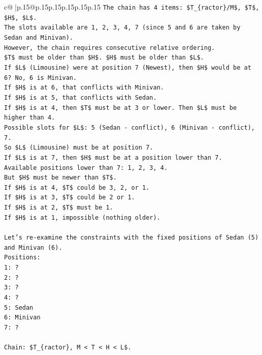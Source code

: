 \documentclass{article}
\begin{document}
{\begin{supertabular}{c@{$\;$}|p{.15\linewidth}@{}p{.15\linewidth}p{.15\linewidth}p{.15\linewidth}p{.15\linewidth}p{.15\linewidth}}
{{{\texttt{The chain has 4 items: \$T\_\{ractor\}/M\$, \$T\$, \$H\$, \$L\$.} \\
\texttt{The slots available are 1, 2, 3, 4, 7 (since 5 and 6 are taken by Sedan and Minivan).} \\
\texttt{However, the chain requires consecutive relative ordering.} \\
\texttt{\$T\$ must be older than \$H\$. \$H\$ must be older than \$L\$.} \\
\texttt{If \$L\$ (Limousine) were at position 7 (Newest), then \$H\$ would be at 6? No, 6 is Minivan.} \\
\texttt{If \$H\$ is at 6, that conflicts with Minivan.} \\
\texttt{If \$H\$ is at 5, that conflicts with Sedan.} \\
\texttt{If \$H\$ is at 4, then \$T\$ must be at 3 or lower. Then \$L\$ must be higher than 4.} \\
\texttt{Possible slots for \$L\$: 5 (Sedan {-} conflict), 6 (Minivan {-} conflict), 7.} \\
\texttt{So \$L\$ (Limousine) must be at position 7.} \\
\texttt{If \$L\$ is at 7, then \$H\$ must be at a position lower than 7.} \\
\texttt{Available positions lower than 7: 1, 2, 3, 4.} \\
\texttt{But \$H\$ must be newer than \$T\$.} \\
\texttt{If \$H\$ is at 4, \$T\$ could be 3, 2, or 1.} \\
\texttt{If \$H\$ is at 3, \$T\$ could be 2 or 1.} \\
\texttt{If \$H\$ is at 2, \$T\$ must be 1.} \\
\texttt{If \$H\$ is at 1, impossible (nothing older).} \\
\\ 
\texttt{Let's re{-}examine the constraints with the fixed positions of Sedan (5) and Minivan (6).} \\
\texttt{Positions:} \\
\texttt{1: ?} \\
\texttt{2: ?} \\
\texttt{3: ?} \\
\texttt{4: ?} \\
\texttt{5: Sedan} \\
\texttt{6: Minivan} \\
\texttt{7: ?} \\
\\ 
\texttt{Chain: \$T\_\{ractor\}, M < T < H < L\$.} \\
}}}
\end{supertabular}}
\end{document}
